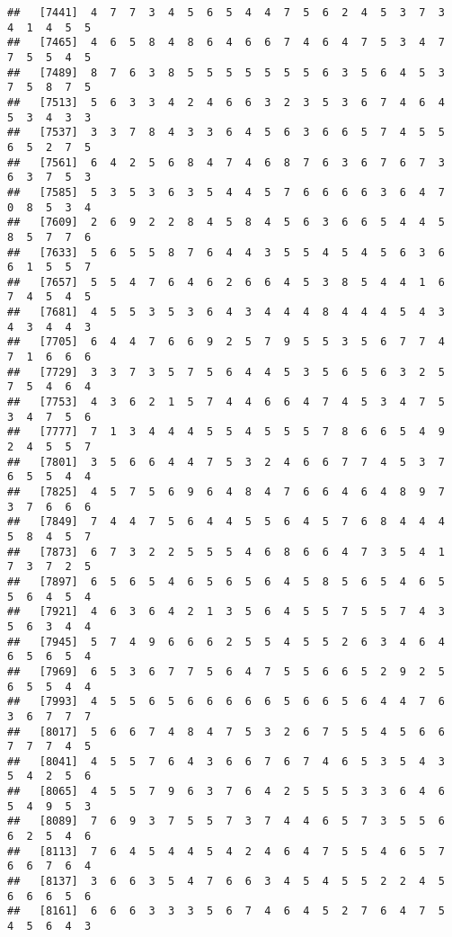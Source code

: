 \documentclass[
]{book}
\begin{document}
\begin{verbatim}
##   [7441]  4  7  7  3  4  5  6  5  4  4  7  5  6  2  4  5  3  7  3  4  1  4  5  5
##   [7465]  4  6  5  8  4  8  6  4  6  6  7  4  6  4  7  5  3  4  7  7  5  5  4  5
##   [7489]  8  7  6  3  8  5  5  5  5  5  5  5  6  3  5  6  4  5  3  7  5  8  7  5
##   [7513]  5  6  3  3  4  2  4  6  6  3  2  3  5  3  6  7  4  6  4  5  3  4  3  3
##   [7537]  3  3  7  8  4  3  3  6  4  5  6  3  6  6  5  7  4  5  5  6  5  2  7  5
##   [7561]  6  4  2  5  6  8  4  7  4  6  8  7  6  3  6  7  6  7  3  6  3  7  5  3
##   [7585]  5  3  5  3  6  3  5  4  4  5  7  6  6  6  6  3  6  4  7  0  8  5  3  4
##   [7609]  2  6  9  2  2  8  4  5  8  4  5  6  3  6  6  5  4  4  5  8  5  7  7  6
##   [7633]  5  6  5  5  8  7  6  4  4  3  5  5  4  5  4  5  6  3  6  6  1  5  5  7
##   [7657]  5  5  4  7  6  4  6  2  6  6  4  5  3  8  5  4  4  1  6  7  4  5  4  5
##   [7681]  4  5  5  3  5  3  6  4  3  4  4  4  8  4  4  4  5  4  3  4  3  4  4  3
##   [7705]  6  4  4  7  6  6  9  2  5  7  9  5  5  3  5  6  7  7  4  7  1  6  6  6
##   [7729]  3  3  7  3  5  7  5  6  4  4  5  3  5  6  5  6  3  2  5  7  5  4  6  4
##   [7753]  4  3  6  2  1  5  7  4  4  6  6  4  7  4  5  3  4  7  5  3  4  7  5  6
##   [7777]  7  1  3  4  4  4  5  5  4  5  5  5  7  8  6  6  5  4  9  2  4  5  5  7
##   [7801]  3  5  6  6  4  4  7  5  3  2  4  6  6  7  7  4  5  3  7  6  5  5  4  4
##   [7825]  4  5  7  5  6  9  6  4  8  4  7  6  6  4  6  4  8  9  7  3  7  6  6  6
##   [7849]  7  4  4  7  5  6  4  4  5  5  6  4  5  7  6  8  4  4  4  5  8  4  5  7
##   [7873]  6  7  3  2  2  5  5  5  4  6  8  6  6  4  7  3  5  4  1  7  3  7  2  5
##   [7897]  6  5  6  5  4  6  5  6  5  6  4  5  8  5  6  5  4  6  5  5  6  4  5  4
##   [7921]  4  6  3  6  4  2  1  3  5  6  4  5  5  7  5  5  7  4  3  5  6  3  4  4
##   [7945]  5  7  4  9  6  6  6  2  5  5  4  5  5  2  6  3  4  6  4  6  5  6  5  4
##   [7969]  6  5  3  6  7  7  5  6  4  7  5  5  6  6  5  2  9  2  5  6  5  5  4  4
##   [7993]  4  5  5  6  5  6  6  6  6  6  5  6  6  5  6  4  4  7  6  3  6  7  7  7
##   [8017]  5  6  6  7  4  8  4  7  5  3  2  6  7  5  5  4  5  6  6  7  7  7  4  5
##   [8041]  4  5  5  7  6  4  3  6  6  7  6  7  4  6  5  3  5  4  3  5  4  2  5  6
##   [8065]  4  5  5  7  9  6  3  7  6  4  2  5  5  5  3  3  6  4  6  5  4  9  5  3
##   [8089]  7  6  9  3  7  5  5  7  3  7  4  4  6  5  7  3  5  5  6  6  2  5  4  6
##   [8113]  7  6  4  5  4  4  5  4  2  4  6  4  7  5  5  4  6  5  7  6  6  7  6  4
##   [8137]  3  6  6  3  5  4  7  6  6  3  4  5  4  5  5  2  2  4  5  6  6  6  5  6
##   [8161]  6  6  6  3  3  3  5  6  7  4  6  4  5  2  7  6  4  7  5  4  5  6  4  3

\end{verbatim}
\end{document}
